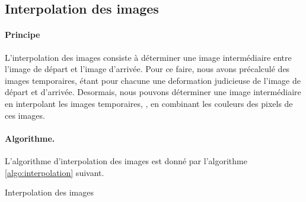 \subsection{Interpolation des images}
\label{subsec:interpolation}
\paragraph{Principe} L'interpolation des images consiste à déterminer une image intermédiaire entre l'image de départ et l'image d'arrivée.
Pour ce faire, nous avons précalculé des images temporaires, étant pour chacune une deformation judicieuse de l'image de départ et d'arrivée.
Desormais, nous pouvons déterminer une image intermédiaire en interpolant les images temporaires, \ie, en combinant les couleurs des pixels de ces images.

\paragraph{Algorithme.} L'algorithme d'interpolation des images est donné par l'algorithme \ref{algo:interpolation} suivant.
\begin{algorithm}[h!]
    \caption{Interpolation des images \cite{beier1992feature}}
    \label{algo:interpolation}
    \BlankLine
\end{algorithm}
